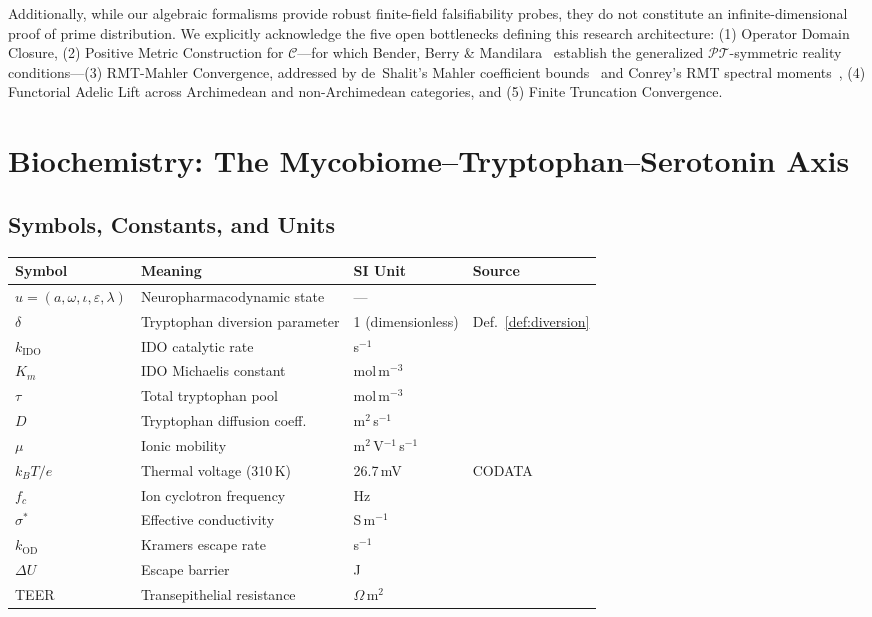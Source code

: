 Additionally, while our algebraic formalisms provide robust finite-field falsifiability probes, they do not constitute an infinite-dimensional proof of prime distribution. We explicitly acknowledge the five open bottlenecks defining this research architecture: (1) Operator Domain Closure, (2) Positive Metric Construction for $\mathcal{C}$---for which Bender, Berry \& Mandilara~\cite{bender-berry-mandilara-12} establish the generalized $\mathcal{PT}$-symmetric reality conditions---(3) RMT-Mahler Convergence, addressed by de~Shalit's Mahler coefficient bounds~\cite{deshalit-mahler-12} and Conrey's RMT spectral moments~\cite{conrey-rmt-12}, (4) Functorial Adelic Lift across Archimedean and non-Archimedean categories, and (5) Finite Truncation Convergence.


\newpage

\section{Biochemistry: The Mycobiome--Tryptophan--Serotonin Axis}

\subsection{Symbols, Constants, and Units}

\begin{center}
\begin{tabular}{@{}llll@{}}
\toprule
Symbol & Meaning & SI Unit & Source \\
\midrule
$u = (a,\omega,\iota,\varepsilon,\lambda)$ & Neuropharmacodynamic state & --- & \cite{lc} \\
$\delta$ & Tryptophan diversion parameter & 1 (dimensionless) & Def.~\ref{def:diversion} \\
$k_\mathrm{IDO}$ & IDO catalytic rate & s$^{-1}$ & \cite{sono96} \\
$K_m$ & IDO Michaelis constant & mol\,m$^{-3}$ & \cite{sono96} \\
$\tau$ & Total tryptophan pool & mol\,m$^{-3}$ & \cite{fernstrom71} \\
$D$ & Tryptophan diffusion coeff. & m$^2$\,s$^{-1}$ & \cite{rj2} \\
$\mu$ & Ionic mobility & m$^2$\,V$^{-1}$\,s$^{-1}$ & \cite{rj2} \\
$k_B T/e$ & Thermal voltage (310\,K) & 26.7\,mV & CODATA \\
$f_c$ & Ion cyclotron frequency & Hz & \cite{rj2,rja} \\
$\sigma^*$ & Effective conductivity & S\,m$^{-1}$ & \cite{rj2,rja} \\
$k_\mathrm{OD}$ & Kramers escape rate & s$^{-1}$ & \cite{rj2} \\
$\Delta U$ & Escape barrier & J & \cite{rj2} \\
TEER & Transepithelial resistance & $\Omega$\,m$^2$ & \cite{srinivasan15} \\
\bottomrule
\end{tabular}
\end{center}

